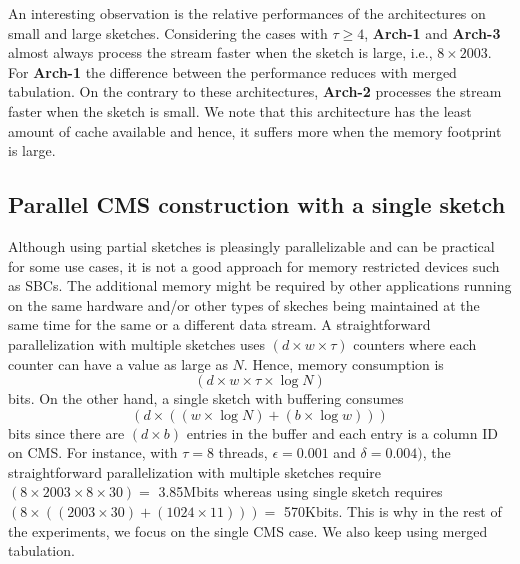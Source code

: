\documentclass[10pt, review=true,sigconf]{acmart}
\begin{document}
An interesting observation is the relative performances of the architectures on small and large sketches. Considering the cases with $\tau \geq 4$, \textbf{Arch-1} and \textbf{Arch-3} almost always process the stream faster when the sketch is large, i.e., $8 \times 2003$. For \textbf{Arch-1} the difference between the performance reduces with merged tabulation. On the contrary to these architectures, \textbf{Arch-2} processes the stream faster when the sketch is small. We note that this architecture has the least amount of cache available and hence, it suffers more when the memory footprint is large. 



\subsection{Parallel CMS construction with a single sketch}

Although using partial sketches is pleasingly parallelizable and can be practical for some use cases, it is not a good approach for memory restricted devices such as SBCs. The additional memory might be required by other applications running on the same hardware and/or other types of skeches being maintained at the same time for the same or a different data stream. 
A straightforward parallelization with multiple sketches uses $(d \times w \times \tau)$ counters
where each counter can have a value as large as $N$. Hence, memory consumption is
$$(d \times w \times \tau \times \log N)$$ bits. On the other hand, a single sketch with buffering
consumes $$(d \times ((w \times \log N) + (b \times \log w)))$$ bits since there are $(d \times b)$ entries in the
buffer and each entry is a column ID on CMS. For instance, with $\tau = 8$ threads, $\epsilon = 0.001$ and $\delta = 0.004)$, the straightforward parallelization with multiple
sketches require $(8 \times 2003 \times 8 \times 30) =$ 3.85Mbits whereas using single sketch requires
$(8 \times ((2003 \times 30) + (1024 \times 11))) =$ 570Kbits. This is why in the rest of the experiments, we focus on the single CMS case. We also keep using merged tabulation.  
\end{document}
